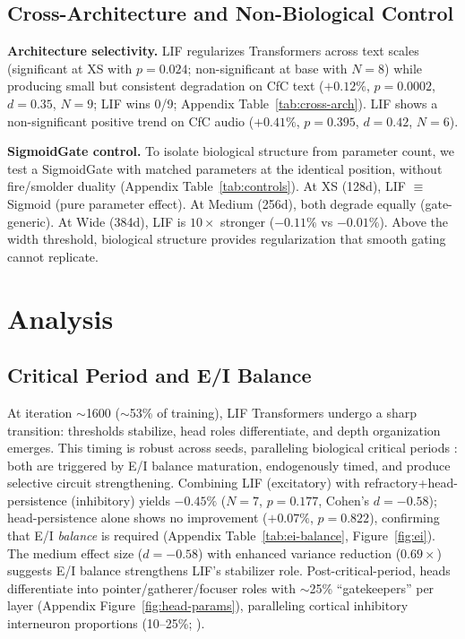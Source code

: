 \documentclass[11pt]{article}
\begin{document}
\subsection{Cross-Architecture and Non-Biological Control}
\label{sec:cross-arch}
\label{sec:controls}

\textbf{Architecture selectivity.} LIF regularizes Transformers across text scales (significant at XS with $p = 0.024$; non-significant at base with $N{=}8$) while producing small but consistent degradation on CfC text ($+0.12\%$, $p = 0.0002$, $d = 0.35$, $N{=}9$; LIF wins 0/9; Appendix Table~\ref{tab:cross-arch}). LIF shows a non-significant positive trend on CfC audio ($+0.41\%$, $p = 0.395$, $d = 0.42$, $N{=}6$).

\textbf{SigmoidGate control.} To isolate biological structure from parameter count, we test a SigmoidGate with matched parameters at the identical position, without fire/smolder duality (Appendix Table~\ref{tab:controls}). At XS (128d), LIF $\equiv$ Sigmoid (pure parameter effect). At Medium (256d), both degrade equally (gate-generic). At Wide (384d), LIF is $10\times$ stronger ($-0.11\%$ vs $-0.01\%$). Above the width threshold, biological structure provides regularization that smooth gating cannot replicate.

\section{Analysis}

\subsection{Critical Period and E/I Balance}
\label{sec:critical-period}
\label{sec:ei-balance}

At iteration $\sim$1600 ($\sim$53\% of training), LIF Transformers undergo a sharp transition: thresholds stabilize, head roles differentiate, and depth organization emerges. This timing is robust across seeds, paralleling biological critical periods \cite{hensch2005critical}: both are triggered by E/I balance maturation, endogenously timed, and produce selective circuit strengthening. Combining LIF (excitatory) with refractory+head-persistence (inhibitory) yields $-0.45\%$ ($N{=}7$, $p = 0.177$, Cohen's $d = -0.58$); head-persistence alone shows no improvement ($+0.07\%$, $p = 0.822$), confirming that E/I \emph{balance} is required (Appendix Table~\ref{tab:ei-balance}, Figure~\ref{fig:ei}). The medium effect size ($d = -0.58$) with enhanced variance reduction ($0.69\times$) suggests E/I balance strengthens LIF's stabilizer role. Post-critical-period, heads differentiate into pointer/gatherer/focuser roles with $\sim$25\% ``gatekeepers'' per layer (Appendix Figure~\ref{fig:head-params}), paralleling cortical inhibitory interneuron proportions (10--25\%; \cite{alizadeh2024ei}).
\end{document}
